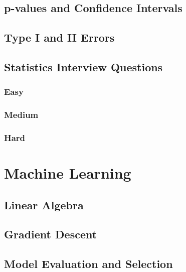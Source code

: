 \documentclass[
]{book}
\begin{document}
\hypertarget{p-values-and-confidence-intervals}{%
\section{p-values and Confidence Intervals}\label{p-values-and-confidence-intervals}}

\hypertarget{type-i-and-ii-errors}{%
\section{Type I and II Errors}\label{type-i-and-ii-errors}}

\hypertarget{statistics-interview-questions}{%
\section{Statistics Interview Questions}\label{statistics-interview-questions}}

\hypertarget{easy-1}{%
\subsection{Easy}\label{easy-1}}

\hypertarget{medium-1}{%
\subsection{Medium}\label{medium-1}}

\hypertarget{hard-1}{%
\subsection{Hard}\label{hard-1}}

\hypertarget{machine-learning}{%
\chapter{Machine Learning}\label{machine-learning}}

\hypertarget{linear-algebra}{%
\section{Linear Algebra}\label{linear-algebra}}

\hypertarget{gradient-descent}{%
\section{Gradient Descent}\label{gradient-descent}}

\hypertarget{model-evaluation-and-selection}{%
\section{Model Evaluation and Selection}\label{model-evaluation-and-selection}}
\end{document}
